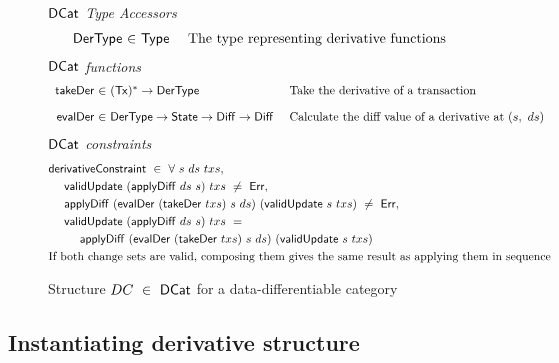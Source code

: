 \begin{figure*}[htb]
  \emph{$\mathsf{DCat}$ Type Accessors}
  \begin{equation*}
    \begin{array}{r@{~\in~}l@{~~~~}lr}
      \type{DerType}
      & \Type
      & \text{The type representing derivative functions}
    \end{array}
  \end{equation*}
  \emph{$\mathsf{DCat}$ functions}
  \begin{equation*}
    \begin{array}{r@{~\in~}l@{~~~~}lr}
      \fun{takeDer} & \seqof{(\type{Tx})} \to \type{DerType} &
      \text{Take the derivative of a transaction}
      \nextdef
      \fun{evalDer} & \type{DerType} \to \type{State} \to \Diff \to \Diff &
      \text{Calculate the diff value of a derivative at $(s,~ds)$}
    \end{array}
  \end{equation*}
  \emph{$\mathsf{DCat}$ constraints}
  \begin{align*}
      &\mathsf{derivativeConstraint} ~\in~ \forall~s~ds~txs,\\
      &~~~~\mathsf{validUpdate} ~(\mathsf{applyDiff}~ ds~ s) ~txs~\neq~\mathsf{Err}, \\
      &~~~~\mathsf{applyDiff} ~(\mathsf{evalDer} ~(\mathsf{takeDer}~ txs) ~s~ ds)~ (\mathsf{validUpdate}~ s ~txs)~\neq~\mathsf{Err}, \\
      &~~~~\mathsf{validUpdate} ~(\mathsf{applyDiff}~ ds~ s) ~txs ~= \\
      &~~~~~~~~ \mathsf{applyDiff} ~(\mathsf{evalDer} ~(\mathsf{takeDer}~ txs) ~s~ ds)~ (\mathsf{validUpdate}~ s ~txs) \\
      & \text{If both change sets are valid, composing them gives the same result as applying them in sequence}
  \end{align*}
  \caption{Structure $DC~\in~\mathsf{DCat}$ for a data-differentiable category }
  \label{fig:diff-cat}
\end{figure*}


\subsection{Instantiating derivative structure}

